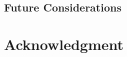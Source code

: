 \documentclass{ieeeojies}
\begin{document}
\subsection{Future Considerations}
\section*{Acknowledgment}
\end{document}

